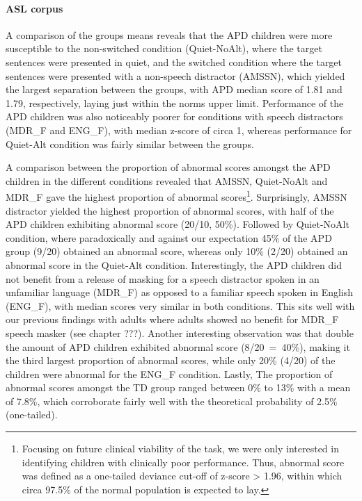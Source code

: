 \documentclass[a4paper, twoside]{templates/ociamthesis}
\begin{document}
\hypertarget{asl-corpus}{%
\paragraph*{ASL corpus}\label{asl-corpus}}

A comparison of the groups means reveals that the APD children were more susceptible to the non-switched condition (Quiet-NoAlt), where the target sentences were presented in quiet, and the switched condition where the target sentences were presented with a non-speech distractor (AMSSN), which yielded the largest separation between the groups, with APD median score of 1.81 and 1.79, respectively, laying just within the norms upper limit. Performance of the APD children was also noticeably poorer for conditions with speech distractors (MDR\_F and ENG\_F), with median z-score of circa 1, whereas performance for Quiet-Alt condition was fairly similar between the groups.

A comparison between the proportion of abnormal scores amongst the APD children in the different conditions revealed that AMSSN, Quiet-NoAlt and MDR\_F gave the highest proportion of abnormal scores\footnote{Focusing on future clinical viability of the task, we were only interested in identifying children with clinically poor performance. Thus, abnormal score was defined as a one-tailed deviance cut-off of z-score \textgreater{} 1.96, within which circa 97.5\% of the normal population is expected to lay.}. Surprisingly, AMSSN distractor yielded the highest proportion of abnormal scores, with half of the APD children exhibiting abnormal score (20/10, 50\%). Followed by Quiet-NoAlt condition, where paradoxically and against our expectation 45\% of the APD group (9/20) obtained an abnormal score, whereas only 10\% (2/20) obtained an abnormal score in the Quiet-Alt condition. Interestingly, the APD children did not benefit from a release of masking for a speech distractor spoken in an unfamiliar language (MDR\_F) as opposed to a familiar speech spoken in English (ENG\_F), with median scores very similar in both conditions. This sits well with our previous findings with adults where adults showed no benefit for MDR\_F speech masker (see chapter ???). Another interesting observation was that double the amount of APD children exhibited abnormal score (8/20~=~40\%), making it the third largest proportion of abnormal scores, while only 20\% (4/20) of the children were abnormal for the ENG\_F condition. Lastly, The proportion of abnormal scores amongst the TD group ranged between 0\% to 13\% with a mean of 7.8\%, which corroborate fairly well with the theoretical probability of 2.5\% (one-tailed).
\end{document}
